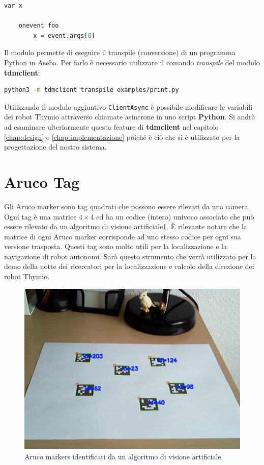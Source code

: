 \documentclass[12pt,a4paper,openright,twoside]{book}
\begin{document}
\begin{lstlisting}[language=Python, label={lst:thymio-catch-event}, caption={Esempio di programma interno a Thymio per la ricezione di eventi (foo)}]
    var x

    onevent foo
        x = event.args[0]
\end{lstlisting}

Il modulo permette di eseguire il transpile (conversione) di un programma Python in Aseba. Per farlo è necessario utilizzare il comando \textit{transpile} del modulo \textbf{tdmclient}:

\begin{lstlisting}[language=Bash, label={lst:transpile-python-to-aseba}, caption={Esempio di transpile di un programma Python (print.py) in Aseba}]
    python3 -m tdmclient transpile examples/print.py
\end{lstlisting}

Utilizzando il modulo aggiuntivo \verb|ClientAsync| è possibile modificare le variabili dei robot Thymio attraverso chiamate asincrone in uno script \textbf{Python}.
Si andrà ad esaminare ulteriormente questa feature di \textbf{tdmclient} nel capitolo \cref{chap:design} e \cref{chap:implementazione} poiché è ciò che si è utilizzato per la progettazione del nostro sistema.

\section{Aruco Tag}

Gli Aruco marker sono tag quadrati che possono essere rilevati da una camera. Ogni tag è una matrice $4 \times 4$ ed ha un codice (intero) univoco associato che può essere rilevato da un algoritmo di visione artificiale\cref{fig:aruco-markers}. È rilevante notare che la matrice di ogni Aruco marker corrisponde ad uno stesso codice per ogni sua versione trasposta. 
Questi tag sono molto utili per la localizzazione e la navigazione di robot autonomi. Sarà questo strumento che verrà utilizzato per la demo della notte dei ricercatori per la localizzazione e calcolo della direzione dei robot Thymio.

\begin{figure}
    \centering
    \includegraphics[width=.8\linewidth]{figures/aruco-markers.png}
    \caption{Aruco markers identificati da un algoritmo di visione artificiale}
    \label{fig:aruco-markers}
\end{figure}
\end{document}
